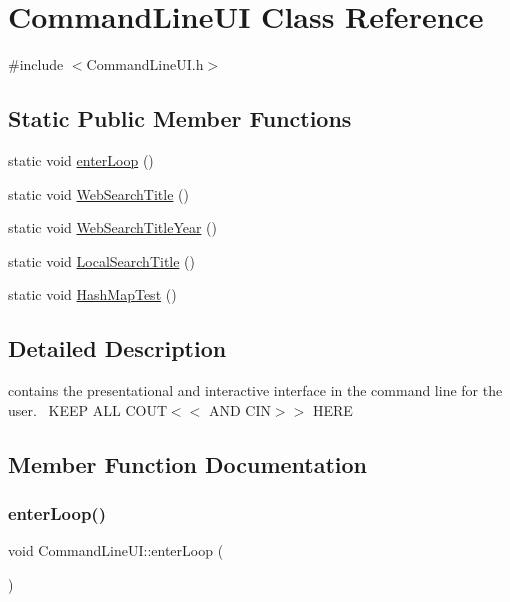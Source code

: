 \hypertarget{class_command_line_u_i}{}\section{Command\+Line\+UI Class Reference}
\label{class_command_line_u_i}


{\ttfamily \#include $<$Command\+Line\+U\+I.\+h$>$}

\subsection*{Static Public Member Functions}
\begin{DoxyCompactItemize}
\item 
static void \hyperlink{class_command_line_u_i_ac72a09121b78bdf1ab1f457795fcf370}{enter\+Loop} ()
\item 
static void \hyperlink{class_command_line_u_i_acddc1d1d643322aa7885e758d9ba0258}{Web\+Search\+Title} ()
\item 
static void \hyperlink{class_command_line_u_i_a9aadc77fe37d190f9a3931c7babac900}{Web\+Search\+Title\+Year} ()
\item 
static void \hyperlink{class_command_line_u_i_aee2e35a46b0e08c2d63e4e560a2ac42e}{Local\+Search\+Title} ()
\item 
static void \hyperlink{class_command_line_u_i_a1264261d9d777d3f76451cf6e69dc3fb}{Hash\+Map\+Test} ()
\end{DoxyCompactItemize}


\subsection{Detailed Description}
contains the presentational and interactive interface in the command line for the user.~\newline
K\+E\+EP A\+LL C\+O\+UT$<$$<$ A\+ND C\+IN$>$$>$ H\+E\+RE 

\subsection{Member Function Documentation}
\mbox{\label{class_command_line_u_i_ac72a09121b78bdf1ab1f457795fcf370}} 
\subsubsection{\texorpdfstring{enter\+Loop()}{enterLoop()}}
{\footnotesize\ttfamily void Command\+Line\+U\+I\+::enter\+Loop (\begin{DoxyParamCaption}{ }\end{DoxyParamCaption})\hspace{0.3cm}{\ttfamily [static]}}

